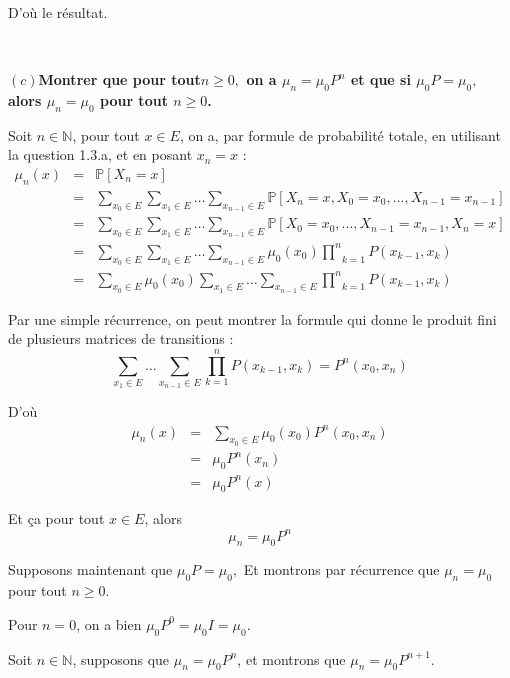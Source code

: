 D'o{\`u} le r{\'e}sultat.

\

\textbf{$(c)$Montrer que pour tout$n \geqslant 0,$ on a $\mu_n =
\mu_0 P^n$ et que si $\mu_0 P = \mu_0,$ alors $\mu_n = \mu_0$ pour tout $n
\geqslant 0$.}

Soit $n \in \mathbb{N}$, pour tout $x \in E$, on a, par formule de
probabilit{\'e} totale, en utilisant la question 1.3.a, et en posant $x_n = x$
:
\begin{eqnarray*}
  \mu_n (x) & = & \mathbb{P}[X_n = x]\\
  & = & \underset{x_0 \in E}{\sum} \underset{x_1 \in E}{\sum} \ldots
  \underset{x_{n - 1} \in E}{\sum} \mathbb{P}[X_n = x, X_0 = x_0, . . ., X_{n
  - 1} = x_{n - 1}]\\
  & = & \underset{x_0 \in E}{\sum} \underset{x_1 \in E}{\sum} \ldots
  \underset{x_{n - 1} \in E}{\sum} \mathbb{P}[X_0 = x_0, . . ., X_{n - 1} =
  x_{n - 1}, X_n = x]\\
  & = & \underset{x_0 \in E}{\sum} \underset{x_1 \in E}{\sum} \ldots
  \underset{x_{n - 1} \in E}{\sum} \mu_0 (x_0) \underset{k =
  1}{\overset{n}{\prod}} P (x_{k - 1}, x_k)\\
  & = & \underset{x_0 \in E}{\sum} \mu_0 (x_0) \underset{x_1 \in E}{\sum}
  \ldots \underset{x_{n - 1} \in E}{\sum} \underset{k = 1}{\overset{n}{\prod}}
  P (x_{k - 1}, x_k)
\end{eqnarray*}


Par une simple r{\'e}currence, on peut montrer la formule qui donne le produit
fini de plusieurs matrices de transitions :
\[ \underset{x_1 \in E}{\sum} \ldots \underset{x_{n - 1} \in E}{\sum}
   \underset{k = 1}{\overset{n}{\prod}} P (x_{k - 1}, x_k) = P^n (x_0, x_n) \]


D'o{\`u}
\begin{eqnarray*}
  \mu_n (x) & = & \underset{x_0 \in E}{\sum} \mu_0 (x_0) P^n (x_0, x_n)\\
  & = & \mu_0 P^n (x_n)\\
  & = & \mu_0 P^n (x )
\end{eqnarray*}


Et {\c c}a pour tout $x \in E$, alors
\[ \mu_n = \mu_0 P^n \]


Supposons maintenant que $\mu_0 P = \mu_0,$ Et montrons par r{\'e}currence que
$\mu_n = \mu_0$ pour tout $n \geqslant 0$.

Pour $n = 0$, on a bien $\mu_0 P^0 = \mu_0 I = \mu_0$.

Soit $n \in \mathbb{N}$, supposons que $\mu_n = \mu_0 P^n$, et montrons que
$\mu_n = \mu_0 P^{n + 1}$.

